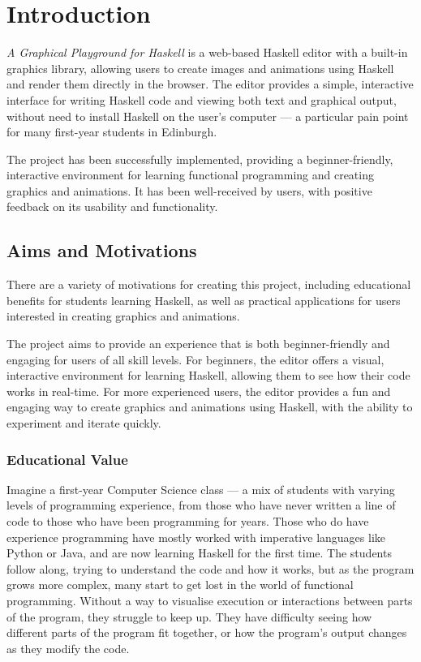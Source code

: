 \documentclass[../main.tex]{subfiles}
\begin{document}
\chapter{Introduction} \label{ch:introduction}
    \emph{A Graphical Playground for Haskell} is a web-based Haskell
    editor with a built-in graphics library, allowing users to create images and
    animations using Haskell and render them directly in the browser.
    The editor provides a simple, interactive interface for writing Haskell code
        and viewing both text and graphical output, without need to install Haskell on
        the user's computer — a particular pain point for many first-year students in
        Edinburgh.

    The project has been successfully implemented, providing a beginner-friendly,
        interactive environment for learning functional programming and creating
        graphics and animations.
    It has been well-received by users, with positive feedback on its usability and
        functionality.

    \section{Aims and Motivations}
        There are a variety of motivations for creating this project, including
            educational benefits for students learning Haskell, as well as practical
            applications for users interested in creating graphics and animations.

        The project aims to provide an experience that is both beginner-friendly and
            engaging for users of all skill levels.
        For beginners, the editor offers a visual, interactive environment for learning
            Haskell, allowing them to see how their code works in real-time.
        For more experienced users, the editor provides a fun and engaging way to
            create graphics and animations using Haskell, with the ability to experiment
            and iterate quickly.

        \subsection{Educational Value}
            Imagine a first-year Computer Science class — a mix of students with varying
                levels of programming experience, from those who have never written a line of
                code to those who have been programming for years.
            Those who do have experience programming have mostly worked with imperative
                languages like Python or Java, and are now learning Haskell for the first time.
            The students follow along, trying to understand the code and how it works, but
                as the program grows more complex, many start to get lost in the world of
                functional programming.
            Without a way to visualise execution or interactions between parts of the
                program, they struggle to keep up.
            They have difficulty seeing how different parts of the program fit together, or
                how the program's output changes as they modify the code.
\end{document}

